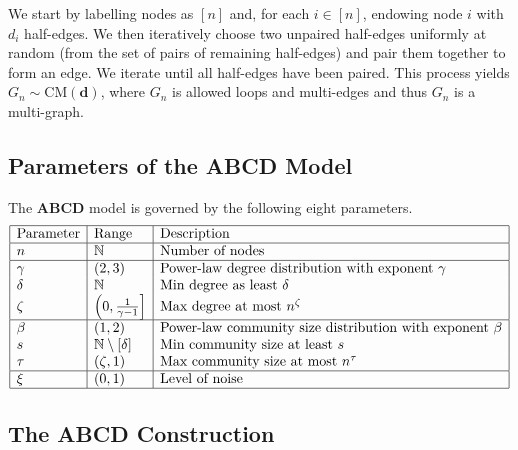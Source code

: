 \documentclass[12pt]{article}
\theoremstyle{definition}
\theoremstyle{remark}
\theoremstyle{remark}
\numberwithin{theorem}{section}
\providecommand{\N}{}
\renewcommand{\N}{{\mathbb N}}
\newcommand{\Pc}{\mathcal{P}}
\begin{document}

We start by labelling nodes as $[n]$ and, for each $i \in [n]$, endowing node $i$ with $d_i$ half-edges. We then iteratively choose two unpaired half-edges uniformly at random (from the set of pairs of remaining half-edges) and pair them together to form an edge. We iterate until all half-edges have been paired. This process yields $G_n \sim \mathrm{CM}(\textbf{d})$, where $G_n$ is allowed loops and multi-edges and thus $G_n$ is a multi-graph.

\subsection{Parameters of the ABCD Model}

The \textbf{ABCD} model is governed by the following eight parameters.
\[
\begin{array}{|l|l|l|}
\hline
\text{Parameter} & \text{Range} & \text{Description}\\
\hline
n & \N & \text{Number of nodes}\\
\hline
\gamma & (2,3) & \text{Power-law degree distribution with exponent } \gamma\\
\delta & \N & \text{Min degree as least } \delta \\
\zeta & \left( 0, \frac{1}{\gamma-1} \right] & \text{Max degree at most } n^\zeta \\
\hline
\beta & (1,2) & \text{Power-law community size distribution with exponent } \beta\\
s & \N \setminus [\delta] & \text{Min community size at least } s \\
\tau & (\zeta,1) & \text{Max community size at most } n^\tau\\
\hline
\xi & (0,1) & \text{Level of noise}\\
\hline
\end{array}
\]

\subsection{The ABCD Construction}\label{subsec:abcd construction}
\end{document}
